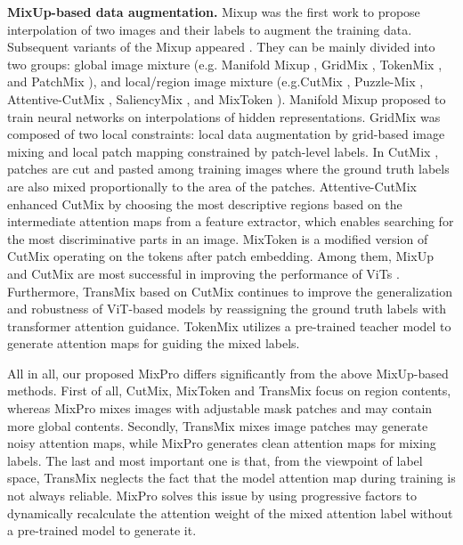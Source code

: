 \documentclass{article} \usepackage{iclr2023_conference,times}
\begin{document}
\textbf{MixUp-based data augmentation.}
Mixup \citep{zhang2017mixup} was the first work to propose interpolation of two images and their labels to augment the training data. Subsequent variants of the Mixup appeared \citep{yun2019cutmix, chen2021transmix, verma2019manifold, baek2021gridmix, patchmix,kim2020puzzle, walawalkar2020attentive, uddin2020saliencymix}. They can be mainly divided into two groups: global image mixture (e.g. Manifold Mixup \citep{verma2019manifold}, GridMix \citep{baek2021gridmix}, TokenMix \citep{liu2022tokenmix}, and PatchMix \citep{patchmix}), and local/region image mixture (e.g.CutMix \citep{zhang2017mixup}, Puzzle-Mix \citep{kim2020puzzle}, Attentive-CutMix \citep{walawalkar2020attentive}, SaliencyMix \citep{uddin2020saliencymix}, and MixToken \citep{tolenlabeling}). Manifold Mixup \citep{verma2019manifold} proposed to train neural networks on interpolations of hidden representations. GridMix \citep{baek2021gridmix} was composed of two local constraints: local data augmentation by grid-based image mixing and local patch mapping constrained by patch-level labels. In CutMix \citep{yun2019cutmix}, patches are cut and pasted among training images where the ground truth labels are also mixed proportionally to the area of the patches. Attentive-CutMix \citep{walawalkar2020attentive} enhanced CutMix by choosing the most descriptive regions based on the intermediate attention maps from a feature extractor, which enables searching for the most discriminative parts in an image. MixToken \citep{tolenlabeling} is a modified version of CutMix operating on the tokens after patch embedding. Among them, MixUp and CutMix are most successful in improving the performance of ViTs \citep{deit}. Furthermore, TransMix \citep{chen2021transmix} based on CutMix continues to improve the generalization and robustness of ViT-based models by reassigning the ground truth labels with transformer attention guidance. TokenMix \citep{liu2022tokenmix} utilizes a pre-trained teacher model to generate attention maps for guiding the mixed labels.





All in all, our proposed MixPro differs significantly from the above MixUp-based methods.
First of all, CutMix, MixToken and TransMix focus on region contents, whereas MixPro mixes images with adjustable mask patches and may contain more global contents. Secondly, TransMix mixes image patches may generate noisy attention maps, while MixPro generates clean attention maps for mixing labels. The last and most important one is that, from the viewpoint of label space, TransMix neglects the fact that the model attention map during training is not always reliable. MixPro solves this issue by using progressive factors to dynamically recalculate the attention weight of the mixed attention label without a pre-trained model to generate it.
\end{document}
